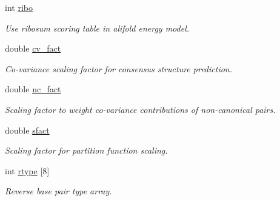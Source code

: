 \begin{DoxyCompactItemize}
\mbox{\label{group__model__details_a3df2ae4bd9c133ef8ab92a53b1d035ec}} 
int \mbox{\hyperlink{group__model__details_a3df2ae4bd9c133ef8ab92a53b1d035ec}{ribo}}
\begin{DoxyCompactList}\small\item\em Use ribosum scoring table in alifold energy model. \end{DoxyCompactList}\item 
\mbox{\label{group__model__details_a62ebefb9d0643e5c4c8a2ec84a105ce6}} 
double \mbox{\hyperlink{group__model__details_a62ebefb9d0643e5c4c8a2ec84a105ce6}{cv\+\_\+fact}}
\begin{DoxyCompactList}\small\item\em Co-\/variance scaling factor for consensus structure prediction. \end{DoxyCompactList}\item 
\mbox{\label{group__model__details_abcf568e6124bfcb2f847ff4eb0dfded6}} 
double \mbox{\hyperlink{group__model__details_abcf568e6124bfcb2f847ff4eb0dfded6}{nc\+\_\+fact}}
\begin{DoxyCompactList}\small\item\em Scaling factor to weight co-\/variance contributions of non-\/canonical pairs. \end{DoxyCompactList}\item 
\mbox{\label{group__model__details_ab6f4cabaa9b4726b13592486d5bc21c7}} 
double \mbox{\hyperlink{group__model__details_ab6f4cabaa9b4726b13592486d5bc21c7}{sfact}}
\begin{DoxyCompactList}\small\item\em Scaling factor for partition function scaling. \end{DoxyCompactList}\item 
\mbox{\label{group__model__details_ad082d0fea31e002b90cdfe5e6382f8b0}} 
int \mbox{\hyperlink{group__model__details_ad082d0fea31e002b90cdfe5e6382f8b0}{rtype}} \mbox{[}8\mbox{]}
\begin{DoxyCompactList}\small\item\em Reverse base pair type array. \end{DoxyCompactList}\item 
\mbox{\label{group__model__details_a66136cf9abc8ff790ec0d33245d68fd5}} 

\end{DoxyCompactItemize}
